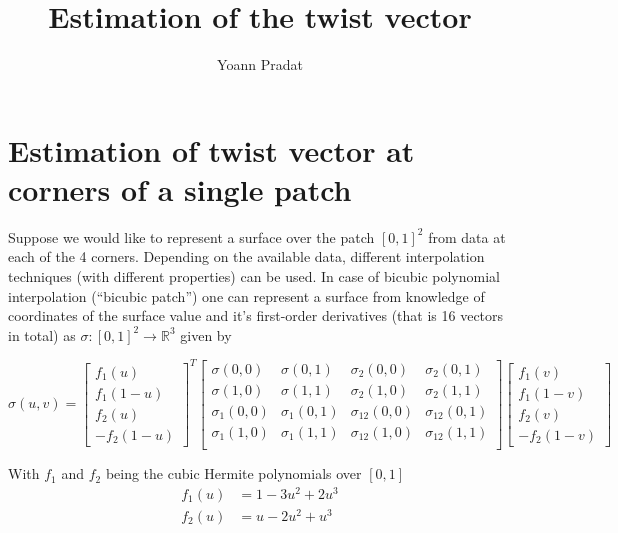\documentclass[a4paper, 11pt]{article}
\begin{document}
\title{Estimation of the twist vector}
\author{Yoann Pradat}
\maketitle
\tableofcontents
\clearpage

\section{Estimation of twist vector at corners of a single patch}

Suppose we would like to represent a surface over the patch ${[0,1]}^2$ from data at each of the 4 corners.  Depending 
on the available data, different interpolation techniques (with different properties) can be used. In case of bicubic 
polynomial interpolation (“bicubic patch”) one can represent a surface from knowledge of coordinates of the surface 
value and it's first-order derivatives (that is 16 vectors in total) as $\sigma : {[0,1]}^2 \to \mathbb{R}^3$ given by

\begin{equation}
  \sigma(u,v) = \begin{bmatrix} f_1(u) \\ f_1(1-u) \\ f_2(u) \\ -f_2(1-u) \end{bmatrix}^T
  \begin{bmatrix}
    \sigma(0,0) & \sigma(0,1) & \sigma_2(0,0) & \sigma_2(0,1) \\
    \sigma(1,0) & \sigma(1,1) & \sigma_2(1,0) & \sigma_2(1,1) \\
    \sigma_1(0,0) & \sigma_1(0,1) & \sigma_{12}(0,0) & \sigma_{12}(0,1) \\
    \sigma_1(1,0) & \sigma_1(1,1) & \sigma_{12}(1,0) & \sigma_{12}(1,1) \\
  \end{bmatrix}
  \begin{bmatrix} f_1(v) \\ f_1(1-v) \\ f_2(v) \\ -f_2(1-v) \end{bmatrix}
\end{equation}

With $f_1$ and $f_2$ being the cubic Hermite polynomials over $[0,1]$
\begin{align*}
  f_1(u) &= 1 - 3u^2 + 2u^3 \\
  f_2(u) &= u - 2u^2 + u^3 \\
\end{align*}
\end{document}
